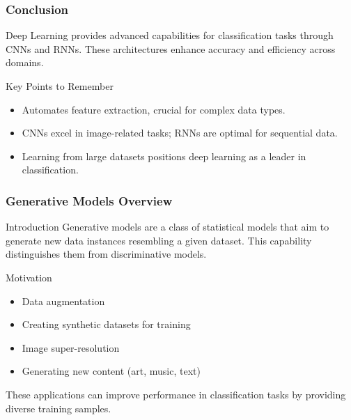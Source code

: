 \documentclass[aspectratio=169]{beamer}
\begin{document}
\begin{frame}[fragile]
    \frametitle{Conclusion}
    Deep Learning provides advanced capabilities for classification tasks through CNNs and RNNs. These architectures enhance accuracy and efficiency across domains.
    
    \begin{block}{Key Points to Remember}
        \begin{itemize}
            \item Automates feature extraction, crucial for complex data types.
            \item CNNs excel in image-related tasks; RNNs are optimal for sequential data.
            \item Learning from large datasets positions deep learning as a leader in classification.
        \end{itemize}
    \end{block}
\end{frame}

\begin{frame}[fragile]
    \frametitle{Generative Models Overview}
    \begin{block}{Introduction}
        Generative models are a class of statistical models that aim to generate new data instances resembling a given dataset. This capability distinguishes them from discriminative models.
    \end{block}
    \begin{block}{Motivation}
        \begin{itemize}
            \item Data augmentation
            \item Creating synthetic datasets for training
            \item Image super-resolution
            \item Generating new content (art, music, text)
        \end{itemize}
        These applications can improve performance in classification tasks by providing diverse training samples.
    \end{block}
\end{frame}
\end{document}
